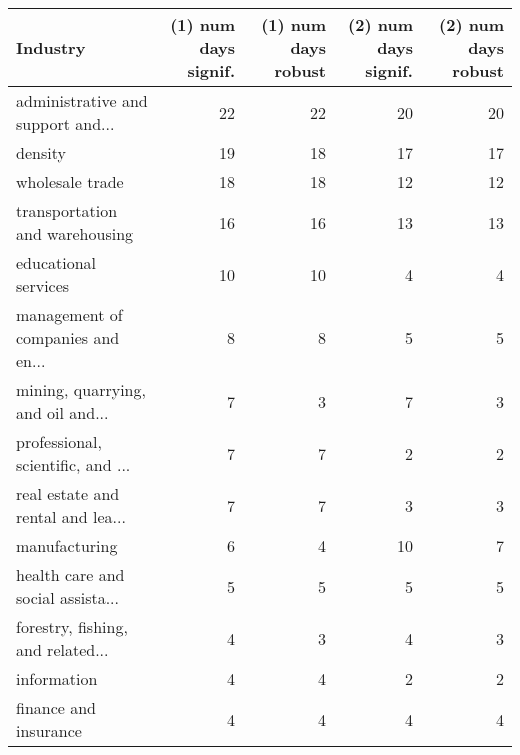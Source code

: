 \begin{tabular}{lrrrr}
\hline
 Industry                          &   (1) num days signif. &   (1) num days robust &   (2) num days signif. &   (2) num days robust \\
\hline
 administrative and support and... &                     22 &                    22 &                     20 &                    20 \\
 density                           &                     19 &                    18 &                     17 &                    17 \\
 wholesale trade                   &                     18 &                    18 &                     12 &                    12 \\
 transportation and warehousing    &                     16 &                    16 &                     13 &                    13 \\
 educational services              &                     10 &                    10 &                      4 &                     4 \\
 management of companies and en... &                      8 &                     8 &                      5 &                     5 \\
 mining, quarrying, and oil and... &                      7 &                     3 &                      7 &                     3 \\
 professional, scientific, and ... &                      7 &                     7 &                      2 &                     2 \\
 real estate and rental and lea... &                      7 &                     7 &                      3 &                     3 \\
 manufacturing                     &                      6 &                     4 &                     10 &                     7 \\
 health care and social assista... &                      5 &                     5 &                      5 &                     5 \\
 forestry, fishing, and related... &                      4 &                     3 &                      4 &                     3 \\
 information                       &                      4 &                     4 &                      2 &                     2 \\
 finance and insurance             &                      4 &                     4 &                      4 &                     4 \\

\end{tabular}

